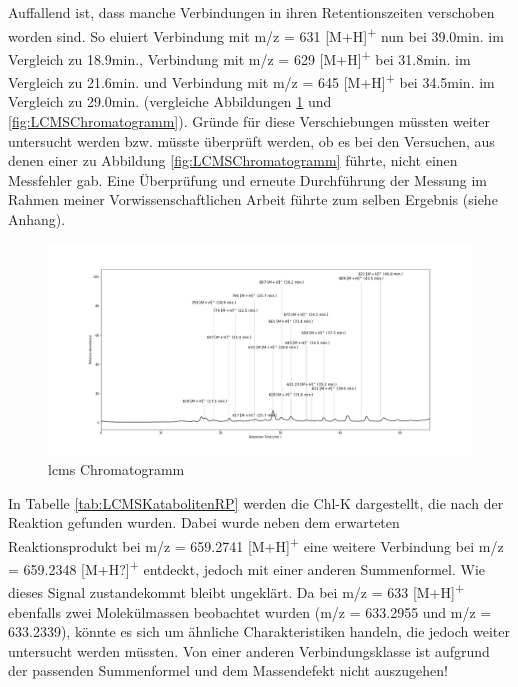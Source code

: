 Auffallend ist, dass manche Verbindungen in ihren Retentionszeiten verschoben worden sind. So eluiert Verbindung mit m/z = 631 [M+H]\textsuperscript{+} nun bei 39.0min. im Vergleich zu 18.9min., Verbindung mit m/z = 629 [M+H]\textsuperscript{+} bei 31.8min. im Vergleich zu 21.6min. und Verbindung mit m/z = 645 [M+H]\textsuperscript{+} bei 34.5min. im Vergleich zu 29.0min. (vergleiche Abbildungen \ref{fig:LCMSCChromatogrammRP} und \ref{fig:LCMSChromatogramm}). Gründe für diese Verschiebungen müssten weiter untersucht werden bzw. müsste überprüft werden, ob es bei den Versuchen, aus denen einer zu Abbildung \ref{fig:LCMSChromatogramm} führte, nicht einen Messfehler gab. Eine Überprüfung und erneute Durchführung der Messung im Rahmen meiner Vorwissenschaftlichen Arbeit führte zum selben Ergebnis (siehe Anhang). 

\begin{figure}[!htbp]
  \centering
  \includegraphics[width=1.4\textwidth, center]{figures/Kapitel6/Reaktion3h/Kuerbis_Analyse_Reaktion3h_Ganzes_Spektrum.png}
  \caption[LC-MS Chromatogramm nach 3h Reaktionsdauer, Quelle: Autor]{\gls{lcms} Chromatogramm}
  \label{fig:LCMSCChromatogrammRP}
\end{figure}

In Tabelle \ref{tab:LCMSKatabolitenRP} werden die \gls{Chl-K} dargestellt, die nach der Reaktion gefunden wurden. Dabei wurde neben dem erwarteten Reaktionsprodukt bei m/z = 659.2741 [M+H]\textsuperscript{+} eine weitere Verbindung bei m/z = 659.2348 [M+H?]\textsuperscript{+} entdeckt, jedoch mit einer anderen Summenformel. Wie dieses Signal zustandekommt bleibt ungeklärt. Da bei m/z = 633 [M+H]\textsuperscript{+} ebenfalls zwei Molekülmassen beobachtet wurden (m/z = 633.2955 und m/z = 633.2339), könnte es sich um ähnliche Charakteristiken handeln, die jedoch weiter untersucht werden müssten. Von einer anderen Verbindungsklasse ist aufgrund der passenden Summenformel und dem Massendefekt nicht auszugehen! \\

